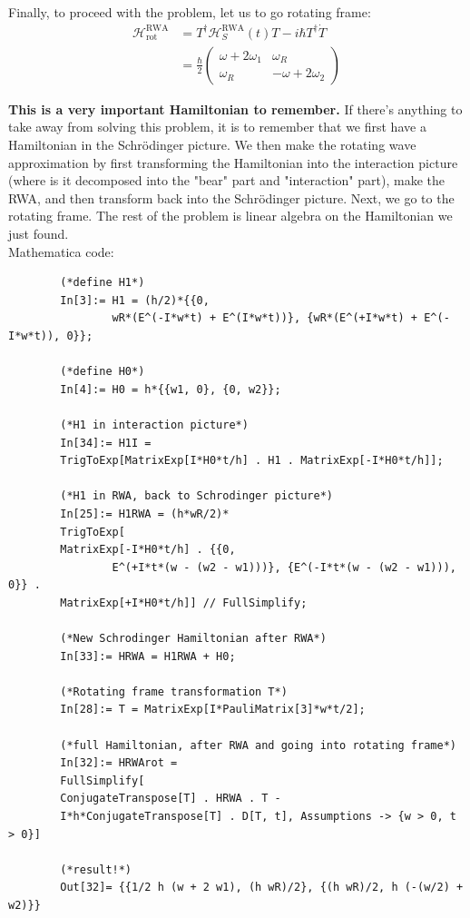 \documentclass{book}
\theoremstyle{definition}
\newcommand{\ham}{\mathcal{H}}
\newcommand{\f}[2]{\frac{#1}{#2}}
\begin{document}
	Finally, to proceed with the problem, let us to go rotating frame:
	\begin{align*}
		\boxed{\ham_\text{rot}^\text{RWA}} &= T^\dagger \ham_S^\text{RWA}(t) T -i\hbar T^\dagger \dot T \\
		&= \boxed{\f{\hbar}{2} \begin{pmatrix}
				\omega + 2 \omega_1 & \omega_R \\ \omega_R & - \omega + 2\omega_2
		\end{pmatrix}}
	\end{align*}

	\textbf{This is a very important Hamiltonian to remember.} If there's anything to take away from solving this problem, it is to remember that we first have a Hamiltonian in the Schr\"{o}dinger picture. We then make the rotating wave approximation by first transforming the Hamiltonian into the interaction picture (where is it decomposed into the "bear" part and "interaction" part), make the RWA, and then transform back into the Schr\"{o}dinger picture. Next, we go to the rotating frame. The rest of the problem is linear algebra on the Hamiltonian we just found. \\
	
	
	
	Mathematica code:
	\begin{lstlisting}
		(*define H1*)
		In[3]:= H1 = (h/2)*{{0, 
				wR*(E^(-I*w*t) + E^(I*w*t))}, {wR*(E^(+I*w*t) + E^(-I*w*t)), 0}};
		
		(*define H0*)
		In[4]:= H0 = h*{{w1, 0}, {0, w2}};
		
		(*H1 in interaction picture*)
		In[34]:= H1I = 
		TrigToExp[MatrixExp[I*H0*t/h] . H1 . MatrixExp[-I*H0*t/h]];
		
		(*H1 in RWA, back to Schrodinger picture*)
		In[25]:= H1RWA = (h*wR/2)*
		TrigToExp[
		MatrixExp[-I*H0*t/h] . {{0, 
				E^(+I*t*(w - (w2 - w1)))}, {E^(-I*t*(w - (w2 - w1))), 0}} . 
		MatrixExp[+I*H0*t/h]] // FullSimplify;
		
		(*New Schrodinger Hamiltonian after RWA*)
		In[33]:= HRWA = H1RWA + H0;
		
		(*Rotating frame transformation T*)
		In[28]:= T = MatrixExp[I*PauliMatrix[3]*w*t/2];
		
		(*full Hamiltonian, after RWA and going into rotating frame*)
		In[32]:= HRWArot = 
		FullSimplify[
		ConjugateTranspose[T] . HRWA . T - 
		I*h*ConjugateTranspose[T] . D[T, t], Assumptions -> {w > 0, t > 0}]
		
		(*result!*)
		Out[32]= {{1/2 h (w + 2 w1), (h wR)/2}, {(h wR)/2, h (-(w/2) + w2)}}
	\end{lstlisting}
	
\end{document}
